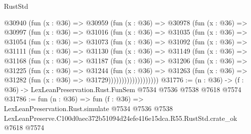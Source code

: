 \begin{lexlean}{RustStd}
\begin{coremodule}
  @30940
    (fun (x : @36) =>
    @30959
      (fun (x : @36) =>
      @30978
        (fun (x : @36) =>
        @30997
          (fun (x : @36) =>
          @31016
            (fun (x : @36) =>
            @31035
              (fun (x : @36) =>
              @31054
                (fun (x : @36) =>
                @31073
                  (fun (x : @36) =>
                  @31092
                    (fun (x : @36) =>
                    @31111
                      (fun (x : @36) =>
                      @31130
                        (fun (x : @36) =>
                        @31149
                          (fun (x : @36) =>
                          @31168
                            (fun (x : @36) =>
                            @31187
                              (fun (x : @36) =>
                              @31206
                                (fun (x : @36) =>
                                @31225
                                  (fun (x : @36) =>
                                  @31244
                                    (fun (x : @36) =>
                                    @31263
                                      (fun (x : @36) =>
                                      @31282 (fun (x : @36) => @31729)))))))))))))))))))
@31776 := (n : @36) -> (f : @36) -> LexLeanPreservation.Rust.FunSem @7534 @7536 @7538 @7618 @7574
@31786 := fun (n : @36) =>
  fun (f : @36) =>
  LexLeanPreservation.Rust.simulate
    @7534
    @7536
    @7538
    LexLeanPreserve.C100d0aec372b51094d24efe416e15dca.R55.RustStd.crate_ok
    @7618
    @7574
\end{coremodule}
\end{lexlean}
